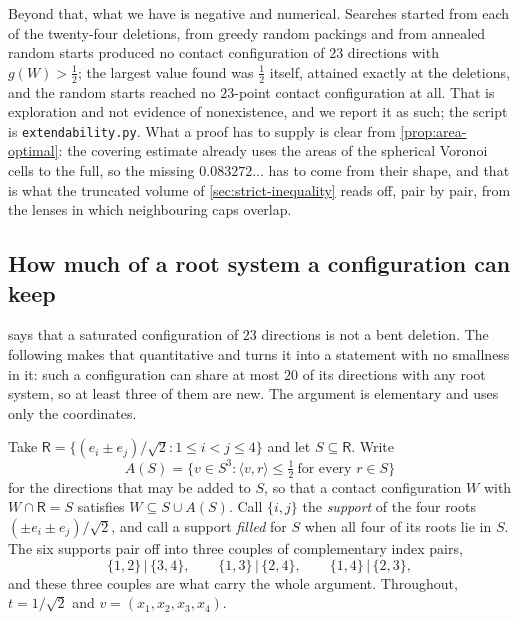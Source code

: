 \documentclass[11pt,reqno]{amsart}
\renewcommand{\_}{\origunderscore\allowbreak}
\numberwithin{equation}{section}
\theoremstyle{plain}
\theoremstyle{definition}
\theoremstyle{remark}
\newcommand{\Rt}{\mathsf{R}}                 %
\begin{document}
Beyond that, what we have is negative and numerical. Searches started
from each of the twenty-four deletions, from greedy random packings and
from annealed random starts produced no contact configuration of $23$
directions with $g(W)>\tfrac12$; the largest value found was $\tfrac12$
itself, attained exactly at the deletions, and the random starts reached
no $23$-point contact configuration at all. That is exploration and not
evidence of nonexistence, and we report it as such; the script is
\texttt{extendability.py}. What a proof has to supply is clear
from \cref{prop:area-optimal}: the covering estimate already uses the
areas of the spherical Voronoi cells to the full, so the missing
$0.083272\ldots$ has to come from their shape, and that is what the
truncated volume of \cref{sec:strict-inequality} reads off, pair by
pair, from the lenses in which neighbouring caps overlap.

\subsection{How much of a root system a configuration can keep}\label{sec:root-meet}

 says that a saturated configuration of $23$
directions is not a bent deletion. The following makes that quantitative
and turns it into a statement with no smallness in it: such a
configuration can share at most $20$ of its directions with any root
system, so at least three of them are new. The argument is elementary and
uses only the coordinates.

Take $\Rt=\{(e_i\pm e_j)/\sqrt2:1\le i<j\le4\}$ and let $S\subseteq\Rt$.
Write
\begin{equation}\label{eq:addable-set}
  A(S)=\bigl\{v\in S^3:\langle v,r\rangle\le\tfrac12\ \text{for every }
  r\in S\bigr\}
\end{equation}
for the directions that may be added to $S$, so that a contact
configuration $W$ with $W\cap\Rt=S$ satisfies $W\subseteq S\cup A(S)$.
Call $\{i,j\}$ the \emph{support} of the four roots
$(\pm e_i\pm e_j)/\sqrt2$, and call a support \emph{filled} for $S$ when
all four of its roots lie in $S$. The six supports pair off into three
couples of complementary index pairs,
\begin{equation}\label{eq:couples}
  \{1,2\}\,\big|\,\{3,4\},
  \qquad
  \{1,3\}\,\big|\,\{2,4\},
  \qquad
  \{1,4\}\,\big|\,\{2,3\},
\end{equation}
and these three couples are what carry the whole argument. Throughout,
$t=1/\sqrt2$ and $v=(x_1,x_2,x_3,x_4)$.
\end{document}

